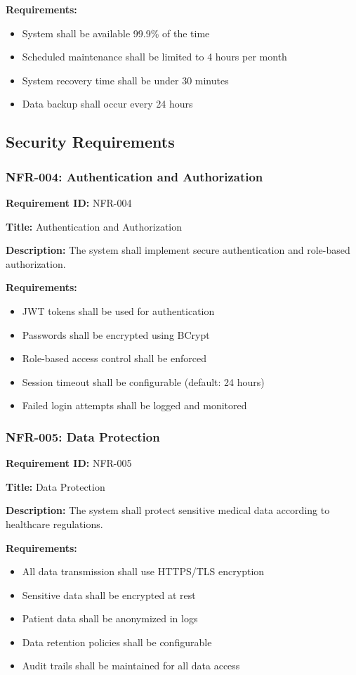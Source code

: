 \documentclass[12pt,a4paper]{article}
\begin{document}
\textbf{Requirements:}
\begin{itemize}
    \item System shall be available 99.9\% of the time
    \item Scheduled maintenance shall be limited to 4 hours per month
    \item System recovery time shall be under 30 minutes
    \item Data backup shall occur every 24 hours
\end{itemize}

\subsection{Security Requirements}

\subsubsection{NFR-004: Authentication and Authorization}

\textbf{Requirement ID:} NFR-004

\textbf{Title:} Authentication and Authorization

\textbf{Description:} The system shall implement secure authentication and role-based authorization.

\textbf{Requirements:}
\begin{itemize}
    \item JWT tokens shall be used for authentication
    \item Passwords shall be encrypted using BCrypt
    \item Role-based access control shall be enforced
    \item Session timeout shall be configurable (default: 24 hours)
    \item Failed login attempts shall be logged and monitored
\end{itemize}

\subsubsection{NFR-005: Data Protection}

\textbf{Requirement ID:} NFR-005

\textbf{Title:} Data Protection

\textbf{Description:} The system shall protect sensitive medical data according to healthcare regulations.

\textbf{Requirements:}
\begin{itemize}
    \item All data transmission shall use HTTPS/TLS encryption
    \item Sensitive data shall be encrypted at rest
    \item Patient data shall be anonymized in logs
    \item Data retention policies shall be configurable
    \item Audit trails shall be maintained for all data access
\end{itemize}
\end{document}

